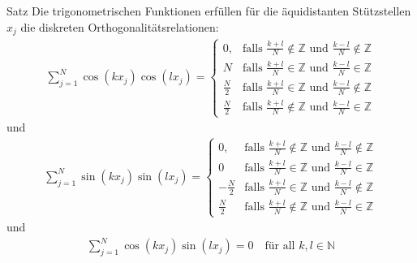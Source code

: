 \begin{colbox}{Satz}
  Die trigonometrischen Funktionen erfüllen für die äquidistanten Stützstellen $x_j$ 
  die diskreten Orthogonalitätsrelationen:
  \begin{align*}
    \sum_{j=1}^{N} \cos(kx_j)\cos(lx_j) = \begin{cases}
      0, &\text{falls } \tfrac{k+l}{N}\notin \mathbb{Z} \text{ und } \tfrac{k-l}{N}\notin \mathbb{Z} \\
      N &\text{falls } \tfrac{k+l}{N}\in \mathbb{Z} \text{ und } \tfrac{k-l}{N}\in \mathbb{Z} \\
      \tfrac{N}{2} &\text{falls } \tfrac{k+l}{N}\in \mathbb{Z} \text{ und } \tfrac{k-l}{N}\notin \mathbb{Z} \\
      \tfrac{N}{2} &\text{falls } \tfrac{k+l}{N}\notin \mathbb{Z} \text{ und } \tfrac{k-l}{N}\in \mathbb{Z}
    \end{cases}
  \end{align*}
  und 
  \begin{align*}
    \sum_{j=1}^{N} \sin(kx_j)\sin(lx_j) = \begin{cases}
      0, &\text{falls } \tfrac{k+l}{N}\notin \mathbb{Z} \text{ und } \tfrac{k-l}{N}\notin \mathbb{Z} \\
      0 &\text{falls } \tfrac{k+l}{N}\in \mathbb{Z} \text{ und } \tfrac{k-l}{N}\in \mathbb{Z} \\
      -\tfrac{N}{2} &\text{falls } \tfrac{k+l}{N}\in \mathbb{Z} \text{ und } \tfrac{k-l}{N}\notin \mathbb{Z} \\
      \tfrac{N}{2} &\text{falls } \tfrac{k+l}{N}\notin \mathbb{Z} \text{ und } \tfrac{k-l}{N}\in \mathbb{Z}
    \end{cases}
  \end{align*}
  und 
  \begin{align*}
    \sum_{j=1}^{N} \cos(kx_j)\sin(lx_j) = 0 \quad \text{für all } k,l\in\mathbb{N}
  \end{align*}
\end{colbox}

